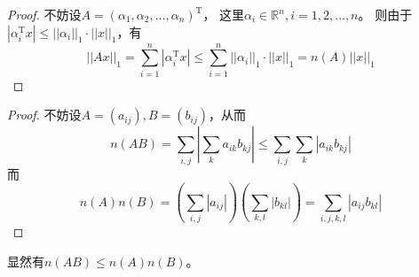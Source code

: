 \documentclass[cn]{homework}
\begin{document}
    \problem
    \begin{subproblem}[(\arabic*)]
        \item
        \begin{proof}
            不妨设$A=(\alpha_1,\alpha_2,\ldots,\alpha_n)^\mathrm{T}$，
            这里$\alpha_i\in\mathbb R^n,i=1,2,\ldots,n$。
            则由于$|\alpha_i^\mathrm Tx|\leq||\alpha_i||_1\cdot||x||_1$，有
            \[||Ax||_1=\sum_{i=1}^n|\alpha_i^\mathrm{T}x|
            \leq\sum_{i=1}^n||\alpha_i||_1\cdot||x||_1
            =n(A)||x||_1\]
        \end{proof}

        \item
        \begin{proof}
            不妨设$A=(a_{ij}),B=(b_{ij})$，从而
            \[n(AB)=\sum_{i,j}\left|\sum_ka_{ik}b_{kj}\right|
            \leq\sum_{i,j}\sum_k|a_{ik}b_{kj}|\]
            而
            \[n(A)n(B)=\left(\sum_{i,j}|a_{ij}|\right)
            \left(\sum_{k,l}|b_{kl}|\right)
            =\sum_{i,j,k,l}|a_{ij}b_{kl}|\]
        \end{proof}
        显然有$n(AB)\leq n(A)n(B)$。
    \end{subproblem}
\end{document}
